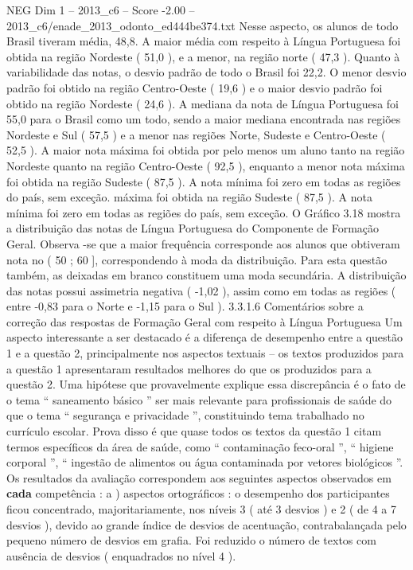 \begin{textsample}{NEG Dim 1 – 2013\_c6 – Score -2.00 – 2013\_c6/enade\_2013\_odonto\_ed444be374.txt}
Nesse aspecto, os alunos de todo Brasil tiveram média, 48,8.
A maior média com respeito à Língua Portuguesa foi obtida na região Nordeste ( 51,0 ), e a menor, na região norte ( 47,3 ).
Quanto à variabilidade das notas, o desvio padrão de todo o Brasil foi 22,2.
O menor desvio padrão foi obtido na região Centro-Oeste ( 19,6 ) e o maior desvio padrão foi obtido na região Nordeste ( 24,6 ).
A mediana da nota de Língua Portuguesa foi 55,0 para o Brasil como um todo, sendo a maior mediana encontrada nas regiões Nordeste e Sul ( 57,5 ) e a menor nas regiões Norte, Sudeste e Centro-Oeste ( 52,5 ).
A maior nota máxima foi obtida por pelo menos um aluno tanto na região Nordeste quanto na região Centro-Oeste ( 92,5 ), enquanto a menor nota máxima foi obtida na região Sudeste ( 87,5 ).
A nota mínima foi zero em todas as regiões do país, sem exceção. máxima foi obtida na região Sudeste ( 87,5 ).
A nota mínima foi zero em todas as regiões do país, sem exceção.
O Gráfico 3.18 mostra a distribuição das notas de Língua Portuguesa do Componente de Formação Geral.
Observa -se que a maior frequência corresponde aos alunos que obtiveram nota no ( 50 ; 60 ], correspondendo à moda da distribuição.
Para esta questão também, as deixadas em branco constituem uma moda secundária.
A distribuição das notas possui assimetria negativa ( -1,02 ), assim como em todas as regiões ( entre -0,83 para o Norte e -1,15 para o Sul ). 3.3.1.6 Comentários sobre a correção das respostas de Formação Geral com respeito à Língua Portuguesa Um aspecto interessante a ser destacado é a diferença de desempenho entre a questão 1 e a questão 2, principalmente nos aspectos textuais – os textos produzidos para a questão 1 apresentaram resultados melhores do que os produzidos para a questão 2.
Uma hipótese que provavelmente explique essa discrepância é o fato de o tema “ saneamento básico ” ser mais relevante para profissionais de saúde do que o tema “ segurança e privacidade ”, constituindo tema trabalhado no currículo escolar.
Prova disso é que quase todos os textos da questão 1 citam termos específicos da área de saúde, como “ contaminação feco-oral ”, “ higiene corporal ”, “ ingestão de alimentos ou água contaminada por vetores biológicos ”.
Os resultados da avaliação correspondem aos seguintes aspectos observados em \textbf{cada} competência : a ) aspectos ortográficos : o desempenho dos participantes ficou concentrado, majoritariamente, nos níveis 3 ( até 3 desvios ) e 2 ( de 4 a 7 desvios ), devido ao grande índice de desvios de acentuação, contrabalançada pelo pequeno número de desvios em grafia.
Foi reduzido o número de textos com ausência de desvios ( enquadrados no nível 4 ).

\end{textsample}

